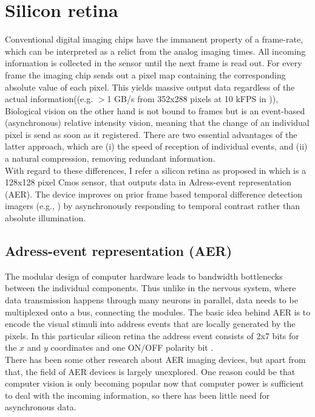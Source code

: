 \documentclass{SeminarV2}
\begin{document}
\section{Silicon retina}
Conventional digital imaging chips have the immanent property of a frame-rate, which can be interpreted as a relict from the analog imaging times. All incoming information is collected in the sensor until the next frame is read out. For every frame the imaging chip sends out a pixel map containing the corresponding absolute value of each pixel. This yields massive output data regardless of the actual information((e.g. $>$1 GB/s from 352x288 pixels at 10 kFPS in \cite{kleinfelder_10000_2001})),   Biological vision on the other hand is not bound to frames but is an event-based (asynchronous) relative intensity vision, meaning that the change of an individual pixel is send as soon as it registered. There are two essential advantages of the latter approach, which are (i) the speed of reception of individual events, and (ii) a natural compression, removing redundant information.\\
With regard to these differences, I refer a silicon retina as proposed in \cite{lichtsteiner_128_2008} which is a 128x128 pixel Cmos sensor, that outputs data in Adress-event representation (AER). The device improves on prior frame based temporal
difference detection imagers (e.g., \cite{mallik_temporal_2005}) by asynchronously responding to temporal contrast rather than absolute illumination.

\subsection{Adress-event representation (AER)}
The modular design of computer hardware leads to bandwidth bottlenecks between the individual components. Thus unlike in the nervous system, where data transmission happens through many neurons in parallel, data needs to be multiplexed onto a bus, connecting the modules. The basic idea behind AER is to encode the visual stimuli into address events that are locally generated by the pixels. In this particular silicon retina the address event consists of 2x7 bits for the $x$ and $y$ coordinates and one ON/OFF polarity bit \cite{lichtsteiner_128_2008}.\\
There has been some other research about AER imaging devices, but apart from that, the field of AER devices is largely unexplored.
One reason could be that computer vision is only becoming popular now that computer power is sufficient to deal with the incoming information, so there has been little need for asynchronous data.
\end{document}
